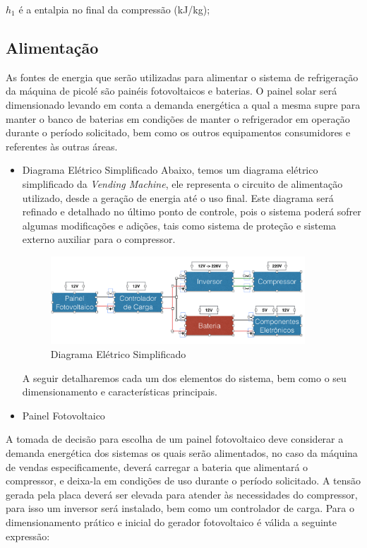 $h_{1}$ é a entalpia no final da compressão (kJ/kg);


\subsection{Alimentação}
	As fontes de energia que serão utilizadas para alimentar o sistema de refrigeração da máquina de picolé são painéis fotovoltaicos e baterias. O painel solar será dimensionado levando em conta a demanda energética a qual a mesma supre para manter o banco de baterias em condições de manter o refrigerador em operação durante o período solicitado, bem como os outros equipamentos consumidores e referentes às outras áreas.

  \begin{itemize}
    \item Diagrama Elétrico Simplificado
    	Abaixo, temos um diagrama elétrico simplificado da \textit{Vending Machine}, ele representa o circuito de alimentação utilizado, desde a geração de energia até o uso final. Este diagrama será refinado e detalhado no último ponto de controle, pois o sistema poderá sofrer algumas modificações e adições, tais como sistema de proteção e sistema externo auxiliar para o compressor.

       \begin{figure}[H]
    \centering
    \includegraphics[width=0.9\textwidth]{figuras/diagrama_simplificado}
    \caption{Diagrama Elétrico Simplificado}
    \label{fig:diagrama_simplificado}
\end{figure}

		A seguir detalharemos cada um dos elementos do sistema, bem como o seu dimensionamento e características principais.

\end{itemize}


\begin{itemize}
\item Painel Fotovoltaico
\end{itemize}
		A tomada de decisão para escolha de um painel fotovoltaico deve considerar a demanda energética dos sistemas os quais serão alimentados, no caso da máquina de vendas especificamente, deverá carregar a bateria que alimentará o compressor, e deixa-la em condições de uso durante o período solicitado. A tensão gerada pela placa deverá ser elevada para atender às necessidades do compressor, para isso um inversor será instalado, bem como um controlador de carga.
        Para o dimensionamento prático e inicial do gerador fotovoltaico é válida a seguinte expressão:

